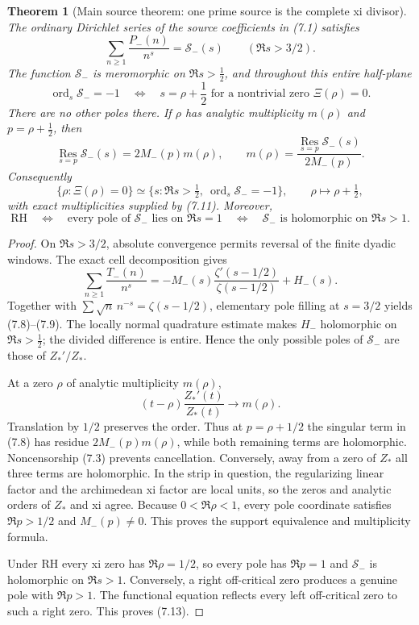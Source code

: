 \documentclass[11pt]{article}
\newtheorem{theorem}{Theorem}[section]
\newcommand{\XiR}{\Xi}
\newcommand{\cS}{\mathcal S}
\newcommand{\ord}{\operatorname{ord}}
\begin{document}
\begin{theorem}[Main source theorem: one prime source is the complete xi divisor]
\label{thm:inverse-tilted-source-tomography}
The ordinary Dirichlet series of the source coefficients in \textup{(7.1)} satisfies
\[
 \sum_{n\ge1}\frac{P_-(n)}{n^s}=\cS_-(s)
 \qquad(\Re s>3/2).
 \tag{7.9}
\]
The function $\cS_-$ is meromorphic on $\Re s>\frac12$, and throughout this entire half-plane
\[
 \ord_s\cS_-=-1
 \quad\Longleftrightarrow\quad
 s=\rho+\frac12
 \text{ for a nontrivial zero }\XiR(\rho)=0.
 \tag{7.10}
\]
There are no other poles there.  If $\rho$ has analytic multiplicity $m(\rho)$ and
$p=\rho+\frac12$, then
\[
 \operatorname*{Res}_{s=p}\cS_-(s)=2M_-(p)m(\rho),
 \qquad
 m(\rho)=\frac{\operatorname*{Res}_{s=p}\cS_-(s)}{2M_-(p)}.
 \tag{7.11}
\]
Consequently
\[
 \{\rho:\XiR(\rho)=0\}
 \simeq
 \{s:\Re s>\tfrac12,\ \ord_s\cS_-=-1\},
 \qquad \rho\longmapsto\rho+\tfrac12,
 \tag{7.12}
\]
with exact multiplicities supplied by \textup{(7.11)}.  Moreover,
\[
 \mathrm{RH}
 \quad\Longleftrightarrow\quad
 \text{every pole of }\cS_-\text{ lies on }\Re s=1
 \quad\Longleftrightarrow\quad
 \cS_-\text{ is holomorphic on }\Re s>1.
 \tag{7.13}
\]
\end{theorem}

\begin{proof}
On $\Re s>3/2$, absolute convergence permits reversal of the finite dyadic windows.  The exact
cell decomposition gives
\[
 \sum_{n\ge1}\frac{T_-(n)}{n^s}
 =-M_-(s)\frac{\zeta'(s-1/2)}{\zeta(s-1/2)}+H_-(s).
\]
Together with $\sum\sqrt n\,n^{-s}=\zeta(s-1/2)$, elementary pole filling
at $s=3/2$ yields \textup{(7.8)}--\textup{(7.9)}.  The locally normal quadrature estimate makes
$H_-$ holomorphic on $\Re s>\frac12$; the divided difference is entire.  Hence the only possible
poles of $\cS_-$ are those of $Z_*'/Z_*$.

At a zero $\rho$ of analytic multiplicity $m(\rho)$,
\[
 (t-\rho)\frac{Z_*'(t)}{Z_*(t)}\longrightarrow m(\rho).
\]
Translation by $1/2$ preserves the order.  Thus at $p=\rho+1/2$ the singular term in
\textup{(7.8)} has residue $2M_-(p)m(\rho)$, while both remaining terms are holomorphic.
Noncensorship \textup{(7.3)} prevents cancellation.  Conversely, away from a zero of $Z_*$ all
three terms are holomorphic.  In the strip in question, the regularizing linear factor and the
archimedean xi factor are local units, so the zeros and analytic orders of $Z_*$ and xi agree.
Because $0<\Re\rho<1$, every pole coordinate satisfies $\Re p>1/2$ and $M_-(p)\ne0$.
This proves the support equivalence and multiplicity formula.

Under RH every xi zero has $\Re\rho=1/2$, so every pole has $\Re p=1$ and $\cS_-$ is holomorphic
on $\Re s>1$.  Conversely, a right off-critical zero produces a genuine pole with $\Re p>1$.
The functional equation reflects every left off-critical zero to such a right zero.  This proves
\textup{(7.13)}.
\end{proof}
\end{document}

